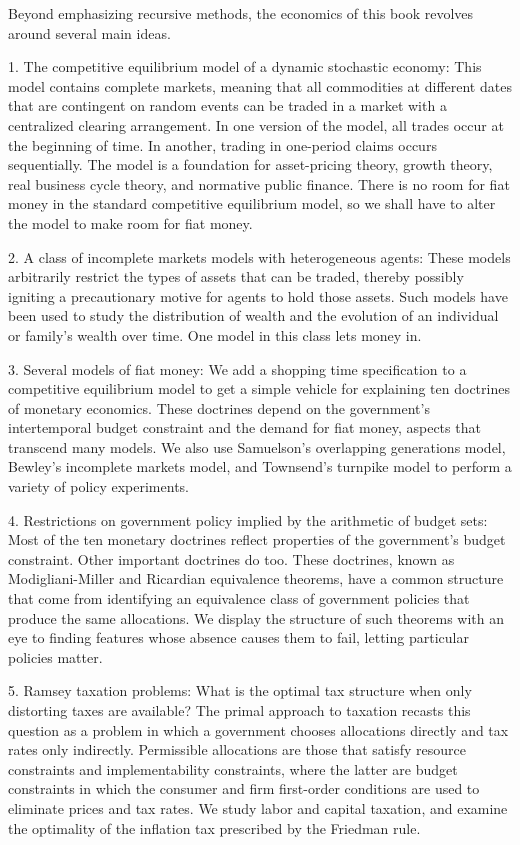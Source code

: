 
\noindent Beyond emphasizing recursive  methods,
     the economics  of this book
revolves around several main  ideas.
\medskip
\item{1.}  The competitive equilibrium model of
a dynamic stochastic economy:
This model contains  complete markets, meaning
that  all commodities at different dates
that are contingent  on
random events can be traded in a market with a centralized
clearing arrangement.  In one version of the model,
all trades occur at the beginning of time.  In another,
trading in one-period claims occurs sequentially.
The model   is a foundation for  asset-pricing theory, growth
theory, real business cycle theory, and normative
public finance.    There is no room for fiat money in
the standard competitive equilibrium model, so we
shall have to alter the model to make room for  fiat money.
\medskip
\item{2.} A class of incomplete markets models with heterogeneous
agents:  These models arbitrarily restrict the types of assets
that can be traded, thereby possibly igniting a precautionary
motive    for agents to hold those assets.    Such models
have been used to study the
distribution of wealth  and the evolution of an individual or
family's wealth over time.   One model in this class lets money in.

\medskip
\item{3.}   Several models of
fiat money:    We add a shopping time specification
to a competitive equilibrium model to get a simple vehicle
for explaining ten
  doctrines of monetary economics. These doctrines depend
on the government's intertemporal budget constraint and the demand
for fiat money, aspects that transcend many models.     We also use
Samuelson's overlapping generations model, Bewley's
incomplete markets model,  and Townsend's
turnpike model to perform a variety of policy experiments.

\medskip
\item{4.}  Restrictions on government  policy implied by the arithmetic of
budget sets:  Most of the ten monetary doctrines reflect
properties of the government's budget constraint.  Other
important doctrines do too.
These doctrines, known as Modigliani-Miller
and Ricardian equivalence theorems, have a common structure that come from
identifying an equivalence class of
government policies that produce the same allocations.
We display the structure of such theorems with an eye to
finding
features whose absence causes them to fail, letting
particular policies matter.
\medskip
\item{5.} Ramsey taxation problems:
What is the optimal tax structure when only distorting taxes are
available? The primal approach to taxation recasts this question as a
problem in which a government chooses  allocations directly and  tax rates only indirectly. Permissible allocations are those that
satisfy resource constraints and implementability constraints, where
the latter are budget constraints in which the consumer
and firm first-order conditions are used to eliminate
prices and tax rates. We study labor and
capital taxation, and examine the optimality of the inflation
tax prescribed by the Friedman rule.


